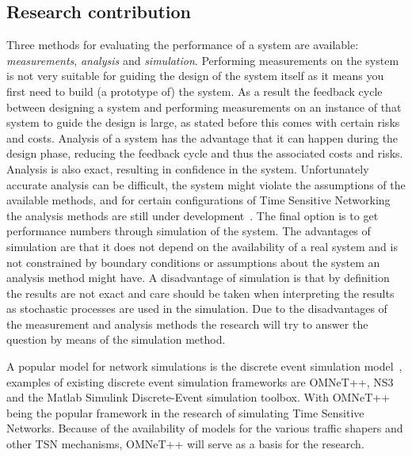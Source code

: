 \subsection{Research contribution}
Three methods for evaluating the performance of a system are available: \textit{measurements}, \textit{analysis} and \textit{simulation}. Performing measurements on the system is not very suitable for guiding the design of the system itself as it means you first need to build (a prototype of) the system. As a result the feedback cycle between designing a system and performing measurements on an instance of that system to guide the design is large, as stated before this comes with certain risks and costs. Analysis of a system has the advantage that it can happen during the design phase, reducing the feedback cycle and thus the associated costs and risks. Analysis is also exact, resulting in confidence in the system. Unfortunately accurate analysis can be difficult, the system might violate the assumptions of the available methods, and for certain configurations of Time Sensitive Networking the analysis methods are still under development~\cite{ashjaei2021time}. The final option is to get performance numbers through simulation of the system. The advantages of simulation are that it does not depend on the availability of a real system and is not constrained by boundary conditions or assumptions about the system an analysis method might have. A disadvantage of simulation is that by definition the results are not exact and care should be taken when interpreting the results as stochastic processes are used in the simulation. Due to the disadvantages of the measurement and analysis methods the research will try to answer the question by means of the simulation method. 

A popular model for network simulations is the discrete event simulation model~\cite{ashjaei2021time}, examples of existing discrete event simulation frameworks are OMNeT++, NS3 and the Matlab Simulink Discrete-Event simulation toolbox. With OMNeT++ being the popular framework in the research of simulating Time Sensitive Networks. Because of the availability of models for the various traffic shapers and other TSN mechanisms, OMNeT++ will serve as a basis for the research. 


